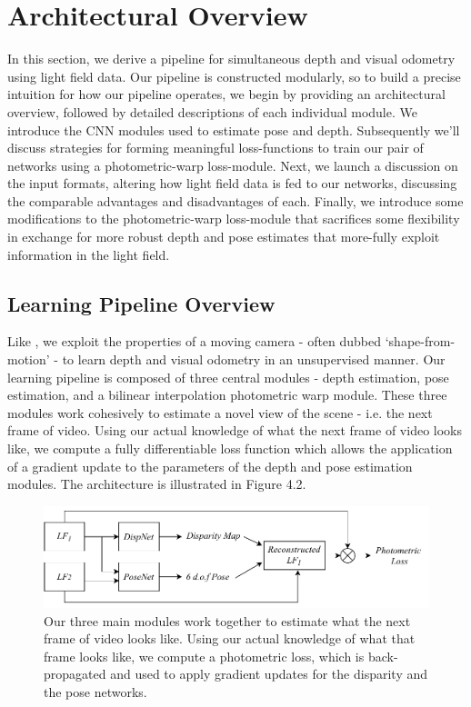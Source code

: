 \section{Architectural Overview}
In this section, we derive a pipeline for simultaneous depth and visual odometry using light field data. Our pipeline is constructed modularly, so to build a precise intuition for how our pipeline operates, we begin by providing an architectural overview, followed by detailed descriptions of each individual module. We introduce the CNN modules used to estimate pose and depth. Subsequently we'll discuss strategies for forming meaningful loss-functions to train our pair of networks using a photometric-warp loss-module. Next, we launch a discussion on the input formats, altering how light field data is fed to our networks, discussing the comparable advantages and disadvantages of each. Finally, we introduce some modifications to the photometric-warp loss-module that sacrifices some flexibility in exchange for more robust depth and pose estimates that more-fully exploit information in the light field. 

\subsection{Learning Pipeline Overview}
Like \cite{zhou2017unsupervised}, we exploit the properties of a moving camera - often dubbed `shape-from-motion' - to learn depth and visual odometry in an unsupervised manner. Our learning pipeline is composed of three central modules - depth estimation, pose estimation, and a bilinear interpolation photometric warp module. These three modules work cohesively to estimate a novel view of the scene - i.e. the next frame of video. Using our actual knowledge of what the next frame of video looks like, we compute a fully differentiable loss function which allows the application of a gradient update to the parameters of the depth and pose estimation modules. The architecture is illustrated in Figure 4.2.

\begin{figure}
    \includegraphics[width=\textwidth]{images/archs/unifiedpipeline.pdf}
    \caption[An architecture for unsupervised learning of depth and pose from light fields]{Our three main modules work together to estimate what the next frame of video looks like. Using our actual knowledge of what that frame looks like, we compute a photometric loss, which is back-propagated and used to apply gradient updates for the disparity and the pose networks.}
\end{figure}

